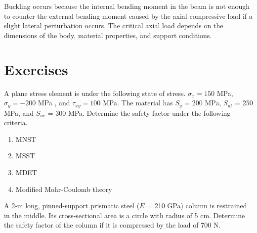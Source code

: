 \documentclass[
fontsize=10pt,
a4paper,
twosides=false,
open=any,
svgnames,
]{kaobook} %
\begin{document}
Buckling occurs because the internal bending moment in the beam is not enough to counter the external bending moment caused by the axial compressive load if a slight lateral perturbation occurs. The critical axial load depends on the dimensions of the body, material properties, and support conditions.

\section*{Exercises}

\begin{exercises}
  
  \item A plane stress element is under the following state of stress.  $\sigma_x = 150$ MPa, $\sigma_y = -200$ MPa , and $\tau_{xy} = 100$ MPa. The material has $S_y$ = 200 MPa, $S_{ut}$ = 250 MPa, and $S_{uc}$ = 300 MPa. Determine the safety factor under the following criteria.
  \begin{enumerate}
  \item MNST
  \item MSST
  \item MDET
  \item Modified Mohr-Coulomb theory
  \end{enumerate}

  \begin{figure}[H]
    \centering
  \end{figure}
  
  \item A 2-m long, pinned-support prismatic steel ($E$ = 210 GPa) column is restrained in the middle. Its cross-sectional area is a circle with radius of 5 cm. Determine the safety factor of the column if it is compressed by the load of 700 N.


\end{exercises}
\end{document}
